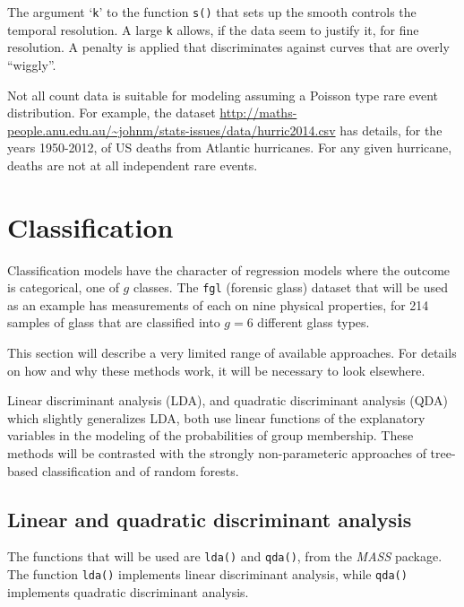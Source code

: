 \documentclass{tufte-book}\usepackage[]{graphicx}\usepackage[]{color}
\newcommand{\txtt}[1]{\texttt{#1}}
\begin{document}
The argument `\txtt{k}' to the function \txtt{s()} that sets up the
smooth controls the temporal resolution.  A large \txtt{k} allows,
if the data seem to justify it, for fine resolution. A penalty is
applied that discriminates against curves that are overly ``wiggly''.

Not all count data is suitable for modeling assuming a Poisson type
rare event distribution. For example, the dataset
\url{http://maths-people.anu.edu.au/~johnm/stats-issues/data/hurric2014.csv}
has details, for the years 1950-2012, of US deaths from Atlantic
hurricanes.  For any given hurricane, deaths are not at all independent
rare events.

\section{Classification}

Classification models 
have the character of regression models where
the outcome is categorical, one of $g$ classes.  The
\texttt{fgl} (forensic glass) dataset that will be used as an example
has measurements of each on nine physical properties, for 214 samples
of glass that are classified into $g=6$ different glass types.  

This section will describe a very limited range of available
approaches.  For details
on how and why these methods work, it will be necessary to look
elsewhere.

Linear discriminant analysis (LDA), and quadratic
discriminant analysis (QDA) which slightly generalizes LDA,
both use linear functions of the explanatory variables in the
modeling of the probabilities of group membership.  These
methods will be contrasted with the strongly non-parameteric
approaches of tree-based classification and of random forests.

\subsection*{Linear and quadratic discriminant analysis}

The functions that will be used are \txtt{lda()}
and \txtt{qda()}, from the \textit{MASS} package.  The function
\txtt{lda()} implements linear discriminant analysis, while
\txtt{qda()} implements quadratic discriminant analysis.
\end{document}
